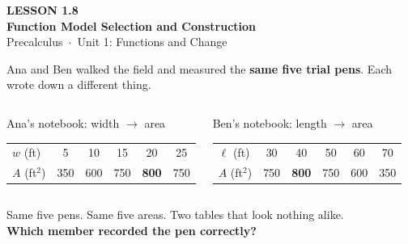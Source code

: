 \documentclass[aspectratio=169, 11pt]{beamer}
\begin{document}
{
\begin{frame}[plain]
  \vspace{2.8cm}\hspace{0.55cm}%
  \begin{minipage}{0.9\textwidth}
    {\color{goldacc}\bfseries\small LESSON 1.8}\\[0.5cm]
    {\color{white}\bfseries\LARGE Function Model Selection and Construction}\\[1.2cm]
    {\color{lilacmid}\small Precalculus~$\cdot$~Unit 1: Functions and Change}
  \end{minipage}
\end{frame}
}

\begin{frame}[t, plain]

  Ana and Ben walked the field and measured the \textbf{same five trial pens}.
  Each wrote down a different thing.

  \smallskip
  \begin{columns}[T, onlytextwidth]
      \begin{block}{Ana's notebook: width \(\to\) area}
        \renewcommand{\arraystretch}{1.2}
        \begin{tabular}{@{}lccccc@{}}
          \(w\) (ft)      & 5 & 10 & 15 & 20 & 25 \\
          \(A\) (ft\(^2\)) & 350 & 600 & 750 & \textbf{800} & 750 \\
        \end{tabular}
      \end{block}

      \begin{block}{Ben's notebook: length \(\to\) area}
        \renewcommand{\arraystretch}{1.2}
        \begin{tabular}{@{}lccccc@{}}
          \(\ell\) (ft)   & 30 & 40 & 50 & 60 & 70 \\
          \(A\) (ft\(^2\)) & 750 & \textbf{800} & 750 & 600 & 350 \\
        \end{tabular}
      \end{block}
  \end{columns}

  \medskip
  \begin{center}
    Same five pens. Same five areas. Two tables that look nothing alike.\\
    \textbf{Which member recorded the pen correctly?}
  \end{center}
\end{frame}
\end{document}
